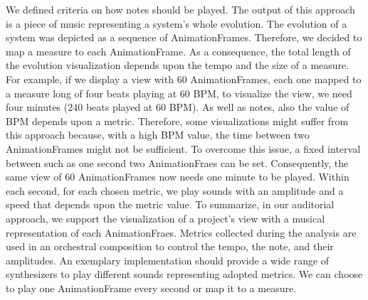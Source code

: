 \bigbreak
We defined criteria on how notes should be played. The output of this approach is a piece of music representing a system's whole evolution. The evolution of a system was depicted as a sequence of AnimationFrames. Therefore, we decided to map a measure to each AnimationFrame. As a consequence, the total length of the evolution visualization depends upon the tempo and the size of a measure. 
For example, if we display a view with 60 AnimationFrames, each one mapped to a measure long of four beats playing at 60 BPM, to visualize the view, we need four minutes ($240$ beats played at $60$ BPM). As well as notes, also the value of BPM depends upon a metric. Therefore, some visualizations might suffer from this approach because, with a high BPM value, the time between two AnimationFrames might not be sufficient. To overcome this issue, a fixed interval between such as one second two AnimationFraes can be set. Consequently, the same view of 60 AnimationFrames now needs one minute to be played. Within each second, for each chosen metric, we play sounds with an amplitude and a speed that depends upon the metric value. 
\bigbreak
To summarize, in our auditorial approach, we support the visualization of a project's view with a musical representation of each AnimationFraes. Metrics collected during the analysis are used in an orchestral composition to control the tempo, the note, and their amplitudes. An exemplary implementation should provide a wide range of synthesizers to play different sounds representing adopted metrics. We can choose to play one AnimationFrame every second or map it to a measure. 










